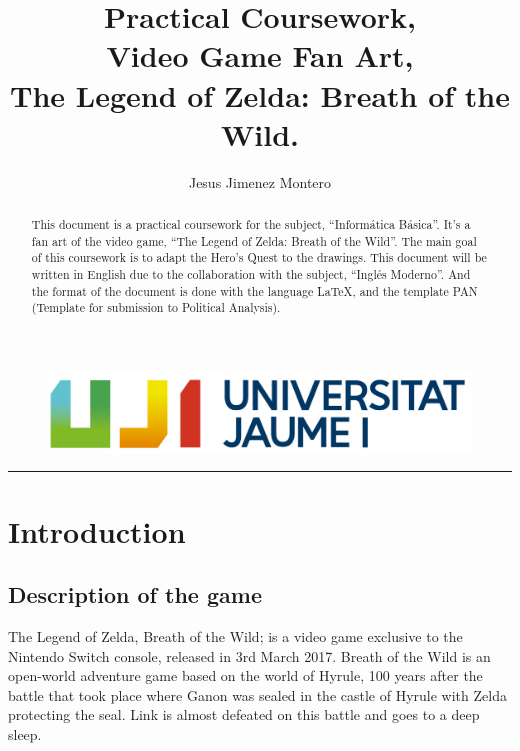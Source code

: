 \documentclass{cup-pan}
\title{Practical Coursework,\\ Video Game Fan Art, \\ The Legend of Zelda: Breath of the Wild.}
\author{Jesus Jimenez Montero}
\affil[1] {Informática Básica, VJ1202}
\affil[2] {Expresión Artística, VJ1204}
\affil[3] {Inglés Moderno, VJ1205}
\begin{document}
\maketitle
\begin{figure}[H]
    \includegraphics[width=\textwidth]{Imagenes/uanl (1).jpg}
\end{figure}
\textcolor{PANDarkBlue}{\hrule}

\medskip
%

\newpage
\tableofcontents
\newpage
\listoffigures
\newpage

\begin{abstract}
    This document is a practical coursework for the subject, “Informática Básica”. It's a fan art of the video game, “The Legend of Zelda: Breath of the Wild”. The main goal of this coursework is to adapt the Hero's Quest to the drawings.
    This document will be written in English due to the collaboration with the subject, “Inglés Moderno”. 
    And the format of the document is done with the language LaTeX, and the template PAN (Template for submission to Political Analysis).
\end{abstract}


\section{Introduction}

    \subsection{Description of the game}
    The Legend of Zelda, Breath of the Wild; is a video game exclusive to the Nintendo Switch console, released in 3rd March 2017. 
    Breath of the Wild is an open-world adventure game based on the world of Hyrule, 100 years after the battle that took place where Ganon was sealed in the castle of Hyrule with Zelda protecting the seal. Link is almost defeated on this battle and goes to a deep sleep.
    
\end{document}
